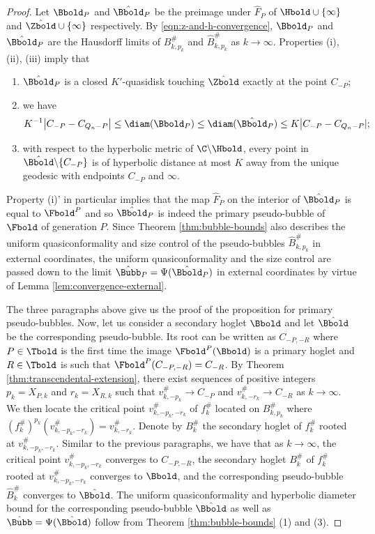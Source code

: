 \documentclass{amsart}
\begin{document}
\begin{proof}
    Let $\Bbold_P$ and $\hat{\Bbold}_P$ be the preimage under $\hat{F}_P$ of $\Hbold \cup \{\infty\}$ and $\hat{\Zbold} \cup \{\infty\}$ respectively.
    By \ref{eqn:z-and-h-convergence}, $\Bbold_P$ and $\hat{\Bbold}_P$ are the Hausdorff limits of $B^{\#}_{k,p_k}$ and $\hat{B}^{\#}_{k,p_k}$ as $k \to \infty$.
    Properties (i), (ii), (iii) imply that
    \begin{enumerate}
        \item[(i)'] $\hat{\Bbold}_P$ is a closed $K'$-quasidisk touching $\hat{\Zbold}$ exactly at the point $C_{-P}$;
        \item[(ii)'] we have
        \[
            K^{-1} \big| C_{-P} - C_{Q_n-P} \big| \leq \diam(\Bbold_P) \leq \diam(\hat{\Bbold}_P) \leq K \big| C_{-P} - C_{Q_n-P}|;
        \]
        \item[(iii)'] with respect to the hyperbolic metric of $\C \backslash \Hbold$, every point in $\hat{\Bbold} \backslash \{C_{-P}\}$ is of hyperbolic distance at most $K$ away from the unique geodesic with endpoints $C_{-P}$ and $\infty$.
    \end{enumerate}
    Property (i)' in particular implies that the map $\hat{F}_P$ on the interior of $\hat{\Bbold}_P$ is equal to $\Fbold^P$ and so $\hat{\Bbold}_P$ is indeed the primary pseudo-bubble of $\Fbold$ of generation $P$.
    Since Theorem \ref{thm:bubble-bounds} also describes the uniform quasiconformality and size control of the pseudo-bubbles $\hat{B}^{\#}_{k,p_k}$ in external coordinates, the uniform quasiconformality and the size control are passed down to the limit $\hat{\Bubb}_P = \Psi(\hat{\Bbold}_P)$ in external coordinates by virtue of Lemma \ref{lem:convergence-external}.

    The three paragraphs above give us the proof of the proposition for primary pseudo-bubbles.
    Now, let us consider a secondary hoglet $\Bbold$ and let $\hat{\Bbold}$ be the corresponding pseudo-bubble.
    Its root can be written as $C_{-P,-R}$ where $P \in \Tbold$ is the first time the image $\Fbold^P(\Bbold)$ is a primary hoglet and $R \in \Tbold$ is such that $\Fbold^{P}(C_{-P,-R}) = C_{-R}$.
    By Theorem \ref{thm:transcendental-extension}, there exist sequences of positive integers $p_k= X_{P,k}$ and $r_k=X_{R,k}$ such that $v^{\#}_{k,-p_k} \to C_{-P}$ and $v^{\#}_{k,-r_k} \to C_{-R}$ as $k \to \infty$.
    We then locate the critical point $v^{\#}_{k,-p_k,-r_k}$ of $f_k^{\#}$ located on $B_{k,p_k}^{\#}$ where $(f_k^{\#})^{p_k}(v^{\#}_{k,-p_k,-r_k}) = v^{\#}_{k,-r_k}$.
    Denote by $B^{\#}_k$ the secondary hoglet of $f_k^{\#}$ rooted at $v^{\#}_{k,-p_k,-r_k}$.
    Similar to the previous paragraphs, we have that as $k \to \infty$, the critical point $v^{\#}_{k,-p_k,-r_k}$ converges to $C_{-P,-R}$, the secondary hoglet $B^{\#}_k$ of $f_k^{\#}$ rooted at $v^{\#}_{k,-p_k,-r_k}$ converges to $\Bbold$, and the corresponding pseudo-bubble $\hat{B}^{\#}_k$ converges to $\hat{\Bbold}$.
    The uniform quasiconformality and hyperbolic diameter bound for the corresponding pseudo-bubble $\hat{\Bbold}$ as well as $\hat{\Bubb} = \Psi(\hat{\Bbold})$ follow from Theorem \ref{thm:bubble-bounds} (1) and (3).


\end{proof}
\end{document}
